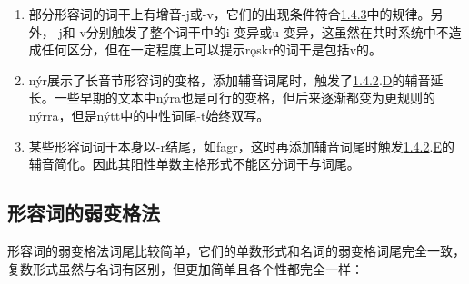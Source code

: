 \begin{enumerate}
  \def\labelenumi{\arabic{enumi})}
  \setcounter{enumi}{2}
  \item
        部分形容词的词干上有增音-j或-v，它们的出现条件符合\hyperref[ux534aux5143ux97f3ux7684ux4fddux6301ux6027]{1.4.3}中的规律。另外，-j和-v分别触发了整个词干中的i-变异或u-变异，这虽然在共时系统中不造成任何区分，但在一定程度上可以提示rǫskr的词干是包括v的。
  \item
        nýr展示了长音节形容词的变格，添加辅音词尾时，触发了\hyperref[ux8f85ux97f3ux7684ux97f3ux53d8]{1.4.2}.\hyperref[_Ref116211616]{D}的辅音延长。一些早期的文本中nýra也是可行的变格，但后来逐渐都变为更规则的nýrra，但是nýtt中的中性词尾-t始终双写。
  \item
        某些形容词词干本身以-r结尾，如fagr，这时再添加辅音词尾时触发\hyperref[ux8f85ux97f3ux7684ux97f3ux53d8]{1.4.2}.\hyperref[_Ref115765758]{E}的辅音简化。因此其阳性单数主格形式不能区分词干与词尾。
\end{enumerate}

\subsection{形容词的弱变格法}\label{ux5f62ux5bb9ux8bcdux7684ux5f31ux53d8ux683cux6cd5}

形容词的弱变格法词尾比较简单，它们的单数形式和名词的弱变格词尾完全一致，复数形式虽然与名词有区别，但更加简单且各个性都完全一样：


